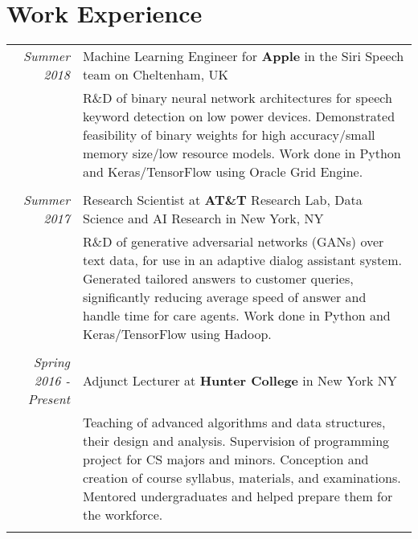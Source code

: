 \documentclass[a4paper,10pt]{article}
\begin{document}
\section{Work Experience}
    \vspace{0.2cm}
    \begin{tabular}{r|p{14cm}}
        \emph{Summer 2018} & Machine Learning Engineer for {\bfseries Apple} in the Siri Speech team on Cheltenham, UK\\
        & \small{R\&D of binary neural network architectures for speech keyword detection on low power devices. Demonstrated feasibility of binary weights for high accuracy/small memory size/low resource models. Work done in Python and Keras/TensorFlow using Oracle Grid Engine.}\\
        \multicolumn{2}{c}{} \\

        \emph{Summer 2017}& Research Scientist at {\bfseries AT\&T} Research Lab, Data Science and AI Research in New York, NY\\
        & \small{R\&D of generative adversarial networks (GANs) over text data, for use in an adaptive dialog assistant system. Generated tailored answers to customer queries, significantly reducing average speed of answer and handle time for care agents. Work done in Python and Keras/TensorFlow using Hadoop.}\\
        \multicolumn{2}{c}{} \\
        
        \emph{Spring 2016 - Present} &  Adjunct Lecturer at {\bfseries Hunter College} in New York NY\\
        & \small{Teaching of advanced algorithms and data structures, their design and analysis. Supervision of programming project for CS majors and minors. Conception and creation of course syllabus, materials, and examinations. Mentored undergraduates and helped prepare them for the workforce. }\\
        \multicolumn{2}{c}{} \\
        

\end{tabular}
\end{document}
